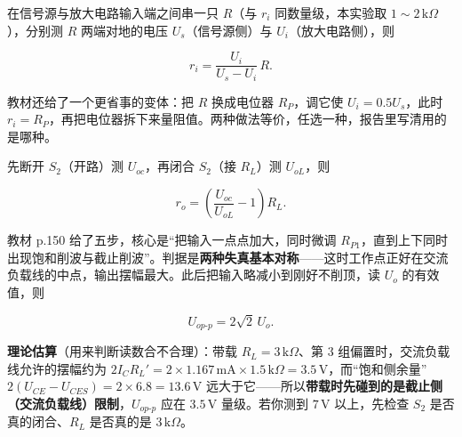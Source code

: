 \documentclass[11pt]{ctexart}
\let\origsubhdr\subhdr
\renewcommand{\subhdr}[1]{\needspace{3\baselineskip}\origsubhdr{#1}}
\begin{document}

在信号源与放大电路输入端之间串一只 $R$（与 $r_i$ 同数量级，本实验取 $1\sim2\,\mathrm{k}\Omega$），分别测 $R$ 两端对地的电压 $U_s$（信号源侧）与 $U_i$（放大电路侧），则

\[
r_i=\frac{U_i}{U_s-U_i}\,R .
\]


教材还给了一个更省事的变体：把 $R$ 换成电位器 $R_P$，调它使 $U_i=0.5U_s$，此时 $r_i=R_P$，再把电位器拆下来量阻值。两种做法等价，任选一种，报告里写清用的是哪种。


先断开 $S_2$（开路）测 $U_{oc}$，再闭合 $S_2$（接 $R_L$）测 $U_{oL}$，则

\[
r_o=\left(\frac{U_{oc}}{U_{oL}}-1\right)R_L .
\]



教材 p.150 给了五步，核心是“把输入一点点加大，同时微调 $R_{P1}$，直到上下同时出现饱和削波与截止削波”。判据是\textbf{两种失真基本对称}——这时工作点正好在交流负载线的中点，输出摆幅最大。此后把输入略减小到刚好不削顶，读 $U_o$ 的有效值，则

\[
U_{op\text{-}p}=2\sqrt{2}\,U_o .
\]


\textbf{理论估算}（用来判断读数合不合理）：带载 $R_L=3\,\mathrm{k}\Omega$、第 3 组偏置时，交流负载线允许的摆幅约为 $2I_C R_L'=2\times1.167\,\mathrm{mA}\times1.5\,\mathrm{k}\Omega=3.5\,\mathrm{V}$，而“饱和侧余量” $2(U_{CE}-U_{CES})=2\times6.8=13.6\,\mathrm{V}$ 远大于它——所以\textbf{带载时先碰到的是截止侧（交流负载线）限制}，$U_{op\text{-}p}$ 应在 $3.5\,\mathrm{V}$ 量级。若你测到 $7\,\mathrm{V}$ 以上，先检查 $S_2$ 是否真的闭合、$R_L$ 是否真的是 $3\,\mathrm{k}\Omega$。
\end{document}
